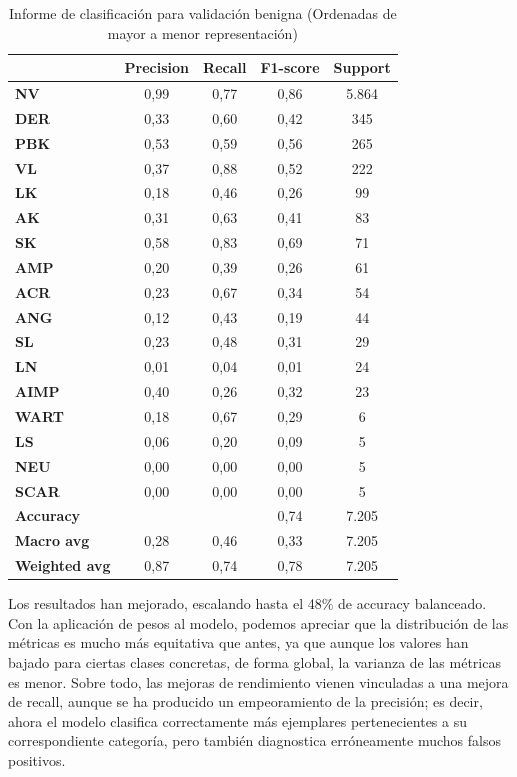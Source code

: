 \begin{table}[!ht]
	\centering
	\begin{tabular}{|l|c|c|c|c|}
		\hline
		& \textbf{Precision} & \textbf{Recall} & \textbf{F1-score} & \textbf{Support} \\
		\hline
	\textbf{NV} & 0,99 & 0,77 & 0,86 & 5.864 \\ 
	\textbf{DER} & 0,33 & 0,60 & 0,42 & 345 \\ 
	\textbf{PBK} & 0,53 & 0,59 & 0,56 & 265 \\ 
	\textbf{VL} & 0,37 & 0,88 & 0,52 & 222 \\ 
	\textbf{LK} & 0,18 & 0,46 & 0,26 & 99 \\ 
	\textbf{AK} & 0,31 & 0,63 & 0,41 & 83 \\ 
	\textbf{SK} & 0,58 & 0,83 & 0,69 & 71 \\ 
	\textbf{AMP} & 0,20 & 0,39 & 0,26 & 61 \\ 
	\textbf{ACR} & 0,23 & 0,67 & 0,34 & 54 \\ 
	\textbf{ANG} & 0,12 & 0,43 & 0,19 & 44 \\ 
	\textbf{SL} & 0,23 & 0,48 & 0,31 & 29 \\ 
	\textbf{LN} & 0,01 & 0,04 & 0,01 & 24 \\ 
	\textbf{AIMP} & 0,40 & 0,26 & 0,32 & 23 \\ 
	\textbf{WART} & 0,18 & 0,67 & 0,29 & 6 \\ 
	\textbf{LS} & 0,06 & 0,20 & 0,09 & 5 \\ 
	\textbf{NEU} & 0,00 & 0,00 & 0,00 & 5 \\ 
	\textbf{SCAR} & 0,00 & 0,00 & 0,00 & 5 \\ 
		\hline
		\textbf{Accuracy} &  &  & 0,74 & 7.205 \\ \hline
		\textbf{Macro avg} & 0,28& 0,46& 0,33&7.205\\
		\textbf{Weighted avg}&0,87&0,74&0,78&7.205\\
		\hline
	\end{tabular}
	\caption{Informe de clasificación para validación benigna (Ordenadas de mayor a menor representación)}
	\label{tab:benignomalmejormetrics}
\end{table}

Los resultados han mejorado, escalando hasta el 48\% de accuracy balanceado. Con la aplicación de pesos al modelo, podemos apreciar que la distribución de las métricas es mucho  más equitativa que antes, ya que aunque los valores han bajado para ciertas clases concretas, de forma global, la varianza de las métricas es menor. Sobre todo, las mejoras de rendimiento vienen vinculadas a una mejora de recall, aunque se ha producido un empeoramiento de la precisión; es decir, ahora el modelo clasifica correctamente más ejemplares pertenecientes a su correspondiente categoría, pero también diagnostica erróneamente muchos falsos positivos.

